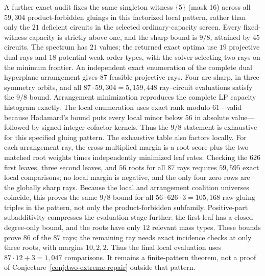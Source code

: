 \documentclass[11pt]{article}
\begin{document}
A further exact audit fixes the same singleton witness $\{5\}$ (mask 16)
across all $59{,}304$ product-forbidden gluings in this factorized local
pattern, rather than only the $21$ deficient circuits in the selected
ordinary-capacity screen. Every fixed-witness capacity is strictly above
one, and the sharp bound is $9/8$, attained by $45$ circuits. The spectrum
has $21$ values; the returned exact optima use $19$ projective dual rays and
$18$ potential weak-order types, with the solver selecting two rays on the
minimum frontier. An independent exact enumeration of the complete dual
hyperplane arrangement gives $87$ feasible projective rays. Four are sharp,
in three symmetry orbits, and all
$87\cdot59{,}304=5{,}159{,}448$ ray--circuit evaluations satisfy the $9/8$
bound. Arrangement minimization reproduces the complete LP capacity
histogram exactly. The
local enumeration uses exact rank modulo $61$---valid because Hadamard's
bound puts every local minor below $56$ in absolute value---followed by
signed-integer-cofactor kernels. Thus the $9/8$ statement is exhaustive for
this specified gluing pattern. The exhaustive table also factors locally.
For each arrangement ray, the cross-multiplied margin is a root score plus
the two matched root weights times independently minimized leaf rates.
Checking the $626$ first leaves, three second leaves, and $56$ roots for all
$87$ rays requires $59{,}595$ exact local comparisons; no local margin is
negative, and the only four zero rows are the globally sharp rays. Because
the local and arrangement coalition universes coincide, this proves the same
$9/8$ bound for all $56\cdot626\cdot3=105{,}168$ raw gluing triples in the
pattern, not only the product-forbidden subfamily. Positive-part
subadditivity compresses the evaluation stage further: the first leaf has a
closed degree-only bound, and the roots have only $12$ relevant mass types.
These bounds prove $86$ of the $87$ rays; the remaining ray needs exact
incidence checks at only three roots, with margins $10,2,2$. Thus the final
local evaluation uses $87\cdot12+3=1{,}047$ comparisons. It remains a
finite-pattern theorem, not a proof of
Conjecture~\ref{conj:two-extreme-repair} outside that pattern.
\end{document}
